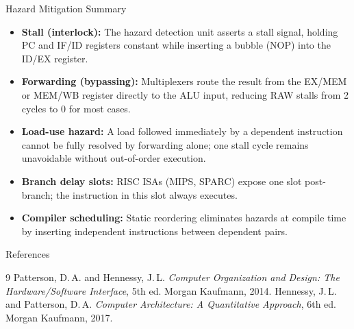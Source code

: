\documentclass{beamer}
\begin{document}
\begin{frame}{Hazard Mitigation Summary}
  \begin{itemize}
    \item \textbf{Stall (interlock):} The hazard detection unit asserts a stall
          signal, holding PC and IF/ID registers constant while inserting a bubble
          (NOP) into the ID/EX register.
    \item \textbf{Forwarding (bypassing):} Multiplexers route the result from the
          EX/MEM or MEM/WB register directly to the ALU input, reducing RAW stalls
          from 2 cycles to 0 for most cases.
    \item \textbf{Load-use hazard:} A load followed immediately by a dependent
          instruction cannot be fully resolved by forwarding alone; one stall cycle
          remains unavoidable without out-of-order execution.
    \item \textbf{Branch delay slots:} RISC ISAs (MIPS, SPARC) expose one slot
          post-branch; the instruction in this slot always executes.
    \item \textbf{Compiler scheduling:} Static reordering eliminates hazards at
          compile time by inserting independent instructions between dependent pairs.
  \end{itemize}
\end{frame}

\begin{frame}{References}
  \begin{thebibliography}{9}
     Patterson, D.\,A. and Hennessy, J.\,L.
      \textit{Computer Organization and Design: The Hardware/Software Interface},
      5th ed. Morgan Kaufmann, 2014.
     Hennessy, J.\,L. and Patterson, D.\,A.
      \textit{Computer Architecture: A Quantitative Approach},
      6th ed. Morgan Kaufmann, 2017.
  \end{thebibliography}
\end{frame}
\end{document}
